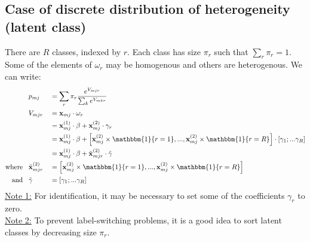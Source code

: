 \documentclass[12pt]{article}
\begin{document}
\subsection{Case of discrete distribution of heterogeneity (latent class)}
There are $R$ classes, indexed by $r$. Each class has size $\pi_r$ such that $\sum_r \pi_r = 1$. \\
Some of the elements of $\omega_r$ may be homogenous and others are heterogenous. We can write:
\begin{equation}
\begin{aligned}
	& p_{mj} && = \sum_r \pi_r \frac{e^{V_{mjr}}}{\sum_k e^{V_{mkr}}} \\
	& V_{mjr} && = \textbf{x}_{mj} \cdot \omega_r \\
	& && = \textbf{x}^{(1)}_{mj} \cdot \beta + \textbf{x}^{(2)}_{mj} \cdot \gamma_r  \\
	& && = \textbf{x}^{(1)}_{mj} \cdot \beta + \left[ \textbf{x}^{(2)}_{mj} \times \mathbbm{1}\{r = 1\} , ... ,  \textbf{x}^{(2)}_{mj} \times \mathbbm{1}\{r = R\} \right] \cdot \left[ \gamma_1; ... \gamma_R \right]  \\
	& && = \textbf{x}^{(1)}_{mj} \cdot \beta  + \tilde{\textbf{x}}^{(2)}_{mjr} \cdot \tilde{\gamma}  \\
\text{where } \hspace*{5pt} & \tilde{\textbf{x}}^{(2)}_{mjr} && = \left[ \textbf{x}^{(2)}_{mj} \times \mathbbm{1}\{r = 1\} , ... ,  \textbf{x}^{(2)}_{mj} \times \mathbbm{1}\{r = R\} \right] \\
\text{and } \hspace*{5pt} & \tilde{\gamma} && = \left[ \gamma_1; ... \gamma_R \right] \\
\end{aligned}
\end{equation}
\underline{Note 1:} For identification, it may be necessary to set some of the coefficients $\gamma_r$ to zero. \\
\underline{Note 2:} To prevent label-switching problems, it is a good idea to sort latent classes by decreasing size $\pi_r$. \\
\end{document}
